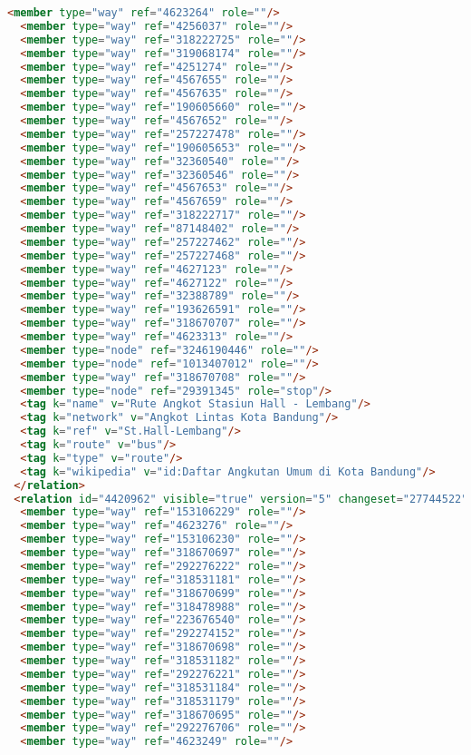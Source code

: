 \begin{lstlisting}[language=HTML,basicstyle=\tiny,caption=test.xml]
  <member type="way" ref="4623264" role=""/>
  <member type="way" ref="4256037" role=""/>
  <member type="way" ref="318222725" role=""/>
  <member type="way" ref="319068174" role=""/>
  <member type="way" ref="4251274" role=""/>
  <member type="way" ref="4567655" role=""/>
  <member type="way" ref="4567635" role=""/>
  <member type="way" ref="190605660" role=""/>
  <member type="way" ref="4567652" role=""/>
  <member type="way" ref="257227478" role=""/>
  <member type="way" ref="190605653" role=""/>
  <member type="way" ref="32360540" role=""/>
  <member type="way" ref="32360546" role=""/>
  <member type="way" ref="4567653" role=""/>
  <member type="way" ref="4567659" role=""/>
  <member type="way" ref="318222717" role=""/>
  <member type="way" ref="87148402" role=""/>
  <member type="way" ref="257227462" role=""/>
  <member type="way" ref="257227468" role=""/>
  <member type="way" ref="4627123" role=""/>
  <member type="way" ref="4627122" role=""/>
  <member type="way" ref="32388789" role=""/>
  <member type="way" ref="193626591" role=""/>
  <member type="way" ref="318670707" role=""/>
  <member type="way" ref="4623313" role=""/>
  <member type="node" ref="3246190446" role=""/>
  <member type="node" ref="1013407012" role=""/>
  <member type="way" ref="318670708" role=""/>
  <member type="node" ref="29391345" role="stop"/>
  <tag k="name" v="Rute Angkot Stasiun Hall - Lembang"/>
  <tag k="network" v="Angkot Lintas Kota Bandung"/>
  <tag k="ref" v="St.Hall-Lembang"/>
  <tag k="route" v="bus"/>
  <tag k="type" v="route"/>
  <tag k="wikipedia" v="id:Daftar Angkutan Umum di Kota Bandung"/>
 </relation>
 <relation id="4420962" visible="true" version="5" changeset="27744522" timestamp="2014-12-28T01:11:33Z" user="gnocin" uid="2526082">
  <member type="way" ref="153106229" role=""/>
  <member type="way" ref="4623276" role=""/>
  <member type="way" ref="153106230" role=""/>
  <member type="way" ref="318670697" role=""/>
  <member type="way" ref="292276222" role=""/>
  <member type="way" ref="318531181" role=""/>
  <member type="way" ref="318670699" role=""/>
  <member type="way" ref="318478988" role=""/>
  <member type="way" ref="223676540" role=""/>
  <member type="way" ref="292274152" role=""/>
  <member type="way" ref="318670698" role=""/>
  <member type="way" ref="318531182" role=""/>
  <member type="way" ref="292276221" role=""/>
  <member type="way" ref="318531184" role=""/>
  <member type="way" ref="318531179" role=""/>
  <member type="way" ref="318670695" role=""/>
  <member type="way" ref="292276706" role=""/>
  <member type="way" ref="4623249" role=""/>

\end{lstlisting}
